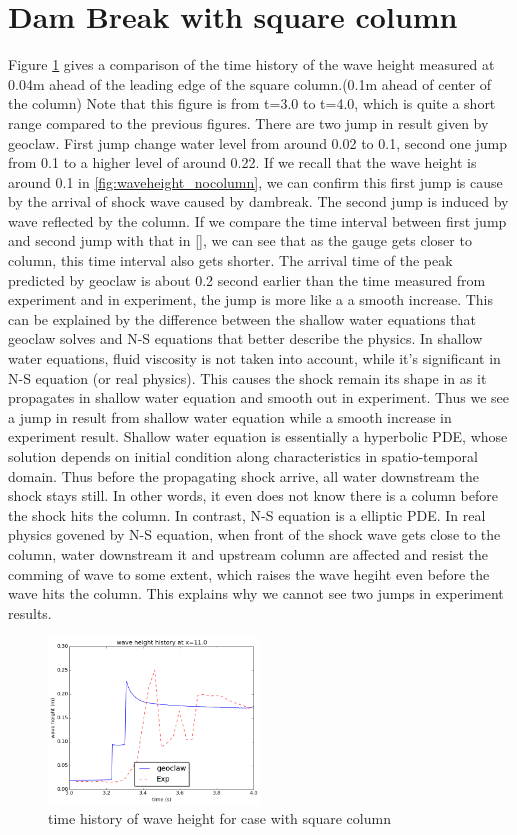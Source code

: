 \documentclass[11pt]{article}
\begin{document}
\section{Dam Break with square column}\label{Sec:Square}
Figure \ref{fig:waveheight_square_x=11.0} gives a comparison of the time history of the wave height measured at 0.04m ahead of the leading edge of the square column.(0.1m ahead of center of the column)
Note that this figure is from t=3.0 to t=4.0, which is quite a short range compared to the previous figures.
There are two jump in result given by geoclaw. First jump change water level from around 0.02 to 0.1, second one jump from 0.1 to a higher level of around 0.22.
If we recall that the wave height is around 0.1 in \ref{fig:waveheight_nocolumn}, we can confirm this first jump is cause by the arrival of shock wave caused by dambreak. The second jump is induced by wave reflected by the column.  
If we compare the time interval between first jump and second jump with that in \ref{}, we can see that as the gauge gets closer to column, this time interval also gets shorter.
%
The arrival time of the peak predicted by geoclaw is about 0.2 second earlier than the time measured from experiment and in experiment, the jump is more like a a smooth increase. 
This can be explained by the difference between the shallow water equations that geoclaw solves and N-S equations that better describe the physics.
In shallow water equations, fluid viscosity is not taken into account, while it's significant in N-S equation (or real physics).
This causes the shock remain its shape in as it propagates in shallow water equation and smooth out in experiment.
Thus we see a jump in result from shallow water equation while a smooth increase in experiment result.
Shallow water equation is essentially a hyperbolic PDE, whose solution depends on initial condition along characteristics in spatio-temporal domain. 
Thus before the propagating shock arrive, all water downstream the shock stays still. In other words, it even does not know there is a column before the shock hits the column. In contrast, N-S equation is a elliptic PDE. 
In real physics govened by N-S equation, when front of the shock wave gets close to the column, water downstream it and upstream column are affected and resist the comming of wave to some extent, which raises the wave hegiht even before the wave hits the column.   
This explains why we cannot see two jumps in experiment results.
\begin{figure}[h!]
    \centering
    \includegraphics[width=0.5\textwidth]{./plots/waveheight_square_x=11}
    \caption{time history of wave height for case with square column}
    \label{fig:waveheight_square_x=11.0}
\end{figure}
\end{document}
